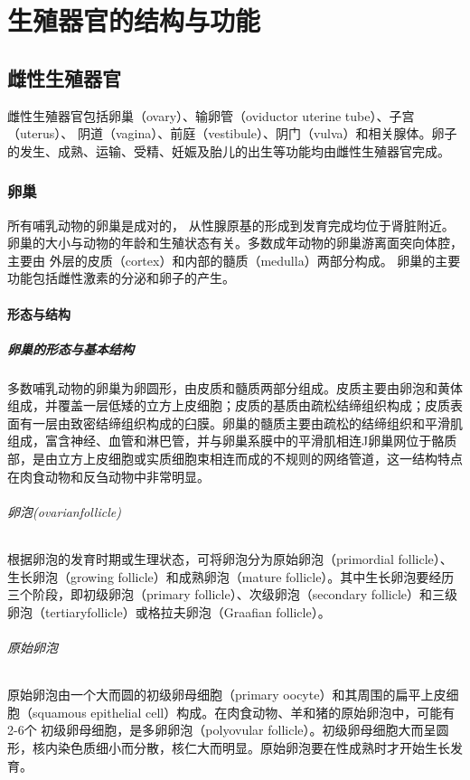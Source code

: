 \chapter{生殖器官的结构与功能}

\section{雌性生殖器官}

雌性生殖器官包括卵巢（ovary）、输卵管（oviductor uterine tube）、子宫（uterus）、 阴道（vagina）、前庭（vestibule）、阴门（vulva）和相关腺体。卵子的发生、成熟、运输、受精、妊娠及胎儿的出生等功能均由雌性生殖器官完成。

\subsection{卵巢}

所有哺乳动物的卵巢是成对的， 从性腺原基的形成到发育完成均位于肾脏附近。 卵巢的大小与动物的年龄和生殖状态有关。多数成年动物的卵巢游离面突向体腔， 主要由 外层的皮质（cortex）和内部的髓质（medulla）两部分构成。 卵巢的主要功能包括雌性激素的分泌和卵子的产生。

\subsubsection{形态与结构}

\paragraph{卵巢的形态与基本结构}

多数哺乳动物的卵巢为卵圆形，由皮质和髓质两部分组成。皮质主要由卵泡和黄体组成，并覆盖一层低矮的立方上皮细胞；皮质的基质由疏松结缔组织构成；皮质表面有一层由致密结缔组织构成的臼膜。卵巢的髓质主要由疏松的结缔组织和平滑肌 组成，富含神经、血管和淋巴管，并与卵巢系膜中的平滑肌相连J卵巢网位于骼质部，是由立方上皮细胞或实质细胞束相连而成的不规则的网络管道，这一结构特点在肉食动物和反刍动物中非常明显。

\subparagraph{卵泡(ovarianfollicle)}

根据卵泡的发育时期或生理状态，可将卵泡分为原始卵泡（primordial follicle）、生长卵泡（growing follicle）和成熟卵泡（mature follicle）。其中生长卵泡要经历三个阶段，即初级卵泡（primary follicle）、次级卵泡（secondary follicle）和三级卵泡（tertiaryfollicle）或格拉夫卵泡（Graafian follicle）。

\subparagraph{原始卵泡}
原始卵泡由一个大而圆的初级卵母细胞（primary oocyte）和其周围的扁平上皮细胞（squamous epithelial cell）构成。在肉食动物、羊和猪的原始卵泡中，可能有2-6个 初级卵母细胞，是多卵卵泡（polyovular follicle）。初级卵母细胞大而呈圆形，核内染色质细小而分散，核仁大而明显。原始卵泡要在性成熟时才开始生长发育。

